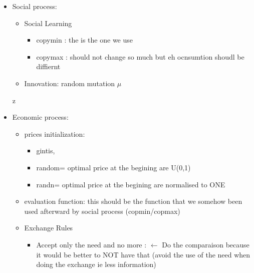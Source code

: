 \documentclass[a4paper]{article}
\begin{document}
	\begin{itemize}
	    \item  Social process: 
		\begin{itemize}
		    \item Social Learning
			\begin{itemize}
			    \item copymin : the is the one we use
			    \item copymax : should not change so much but eh ocnsumtion shoudl be diffiernt
			\end{itemize}
		    \item Innovation: random mutation $\mu$
		\end{itemize}
		
	z    \item  Economic process:
		\begin{itemize}
		    \item prices initialization:
			\begin{itemize}
			    \item gintis,
			    \item random= optimal price at the begining are U(0,1) 
			    \item randn= optimal price at the begining are normalised to ONE
			\end{itemize}
		    \item evaluation function: this should be the function that we somehow been used afterward by social process (copmin/copmax)
		    \item Exchange Rules 
			\begin{itemize}
			    \item Accept only the need and no more : $\leftarrow$ Do the comparaison because it would be better to NOT have that (avoid the use of the need when doing the exchange ie less information)
			\end{itemize}
		\end{itemize}
	\end{itemize}
\end{document}
